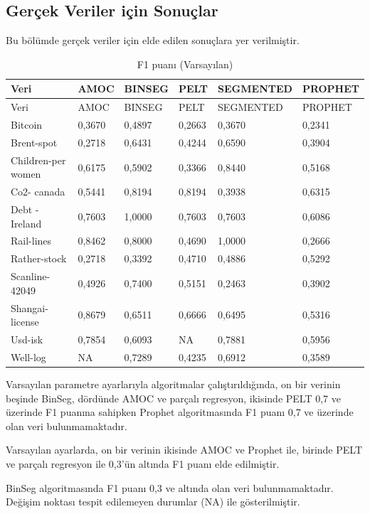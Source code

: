 \documentclass[12pt,twoside]{deuthesis}
\begin{document}
\hypertarget{geruxe7ek-veriler-iuxe7in-sonuuxe7lar}{%
\subsection{Gerçek Veriler için Sonuçlar}\label{geruxe7ek-veriler-iuxe7in-sonuuxe7lar}}

Bu bölümde gerçek veriler için elde edilen sonuçlara yer verilmiştir.

\begin{longtable}[]{@{}llllll@{}}
\caption{\label{tab:nvar2} F1 puanı (Varsayılan)}\tabularnewline
\toprule
Veri & AMOC & BINSEG & PELT & SEGMENTED & PROPHET\tabularnewline
\midrule
\endfirsthead
\toprule
Veri & AMOC & BINSEG & PELT & SEGMENTED & PROPHET\tabularnewline
\midrule
\endhead
Bitcoin & 0,3670 & 0,4897 & 0,2663 & 0,3670 & 0,2341\tabularnewline
Brent-spot & 0,2718 & 0,6431 & 0,4244 & 0,6590 & 0,3904\tabularnewline
Children-per women & 0,6175 & 0,5902 & 0,3366 & 0,8440 & 0,5168\tabularnewline
Co2- canada & 0,5441 & 0,8194 & 0,8194 & 0,3938 & 0,6315\tabularnewline
Debt -Ireland & 0,7603 & 1,0000 & 0,7603 & 0,7603 & 0,6086\tabularnewline
Rail-lines & 0,8462 & 0,8000 & 0,4690 & 1,0000 & 0,2666\tabularnewline
Rather-stock & 0,2718 & 0,3392 & 0,4710 & 0,4886 & 0,5292\tabularnewline
Scanline-42049 & 0,4926 & 0,7400 & 0,5151 & 0,2463 & 0,3902\tabularnewline
Shangai-license & 0,8679 & 0,6511 & 0,6666 & 0,6495 & 0,5316\tabularnewline
Usd-isk & 0,7854 & 0,6093 & NA & 0,7881 & 0,5956\tabularnewline
Well-log & NA & 0,7289 & 0,4235 & 0,6912 & 0,3589\tabularnewline
\bottomrule
\end{longtable}

Varsayılan parametre ayarlarıyla algoritmalar çalıştırıldığında, on bir verinin beşinde BinSeg, dördünde AMOC ve parçalı regresyon, ikisinde PELT 0,7 ve üzerinde F1 puanına sahipken Prophet algoritmasında F1 puanı 0,7 ve üzerinde olan veri bulunmamaktadır.

Varsayılan ayarlarda, on bir verinin ikisinde AMOC ve Prophet ile, birinde PELT ve parçalı regresyon ile 0,3'ün altında F1 puanı elde edilmiştir.

BinSeg algoritmasında F1 puanı 0,3 ve altında olan veri bulunmamaktadır.
Değişim noktası tespit edilemeyen durumlar (NA) ile gösterilmiştir.
\end{document}
